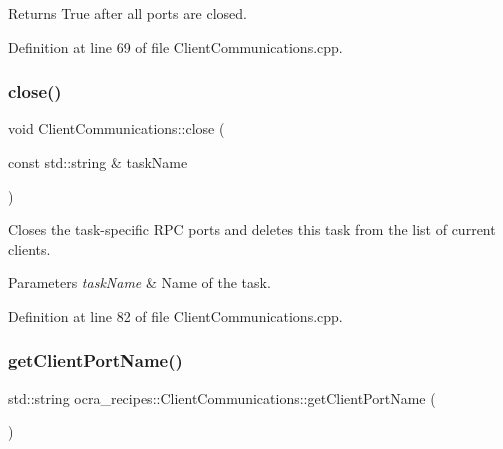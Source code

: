 \begin{DoxyReturn}{Returns}
True after all ports are closed. 
\end{DoxyReturn}


Definition at line 69 of file Client\+Communications.\+cpp.

\hypertarget{classocra__recipes_1_1ClientCommunications_ac96c7e76603600459e94b8fa1a0b213e}{}\label{classocra__recipes_1_1ClientCommunications_ac96c7e76603600459e94b8fa1a0b213e} 
\subsubsection{\texorpdfstring{close()}{close()}\hspace{0.1cm}{\footnotesize\ttfamily [2/2]}}
{\footnotesize\ttfamily void Client\+Communications\+::close (\begin{DoxyParamCaption}\item[{const std\+::string \&}]{task\+Name }\end{DoxyParamCaption})}

Closes the task-\/specific R\+PC ports and deletes this task from the list of current clients.


\begin{DoxyParams}{Parameters}
{\em task\+Name} & Name of the task. \\
\hline
\end{DoxyParams}


Definition at line 82 of file Client\+Communications.\+cpp.

\hypertarget{classocra__recipes_1_1ClientCommunications_aa6a6158593016b02b28122903022b0e6}{}\label{classocra__recipes_1_1ClientCommunications_aa6a6158593016b02b28122903022b0e6} 
\subsubsection{\texorpdfstring{get\+Client\+Port\+Name()}{getClientPortName()}}
{\footnotesize\ttfamily std\+::string ocra\+\_\+recipes\+::\+Client\+Communications\+::get\+Client\+Port\+Name (\begin{DoxyParamCaption}{ }\end{DoxyParamCaption})\hspace{0.3cm}{\ttfamily [inline]}}




